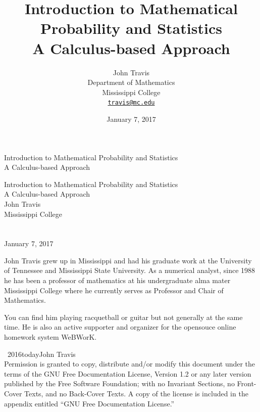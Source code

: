 \documentclass[10pt,]{book}
\title{Introduction to Mathematical Probability and Statistics\\
{\large A Calculus-based Approach}}
\author{John Travis\\
Department of Mathematics\\
Mississippi College\\
\href{mailto:travis@mc.edu}{\nolinkurl{travis@mc.edu}}
}
\date{January 7, 2017}
\theoremstyle{plain}
\theoremstyle{definition}
\theoremstyle{definition}
\theoremstyle{definition}
\numberwithin{equation}{section}
\begin{document}
\frontmatter
\thispagestyle{empty}
{\centering
\vspace*{0.28\textheight}
{\Huge Introduction to Mathematical Probability and Statistics}\\[2\baselineskip]
{\LARGE A Calculus-based Approach}\\
}
\clearpage
\thispagestyle{empty}
\null%
\clearpage
\thispagestyle{empty}
{\centering
\vspace*{0.14\textheight}
{\Huge Introduction to Mathematical Probability and Statistics}\\[\baselineskip]
{\LARGE A Calculus-based Approach}\\[3\baselineskip]
{\Large John Travis}\\[0.5\baselineskip]
{\Large Mississippi College}\\[3\baselineskip]
{\Large }\\[0.5\baselineskip]
{\normalsize }\\[3\baselineskip]
{\Large January 7, 2017}\\}
\clearpage
\thispagestyle{empty}
\noindent
John Travis grew up in Mississippi and had his graduate work at the University of Tennessee and Mississippi State University. As a numerical analyst, since 1988 he has been a professor of mathematics at his undergraduate alma mater Mississippi College where he currently serves as Professor and Chair of Mathematics.%
\par
You can find him playing racquetball or guitar but not generally at the same time. He is also an active supporter and organizer for the opensouce online homework system WeBWorK.%
\par
{}
\noindent\textcopyright\ 2016\textendash{}today\quad{}John Travis\\[0.5\baselineskip]
Permission is granted to copy, distribute and/or modify this document under the terms of the GNU Free Documentation License, Version 1.2 or any later version published by the Free Software Foundation; with no Invariant Sections, no Front-Cover Texts, and no Back-Cover Texts.  A copy of the license is included in the appendix entitled ``GNU Free Documentation License.''\par\medskip
{}
\null\clearpage
\end{document}
